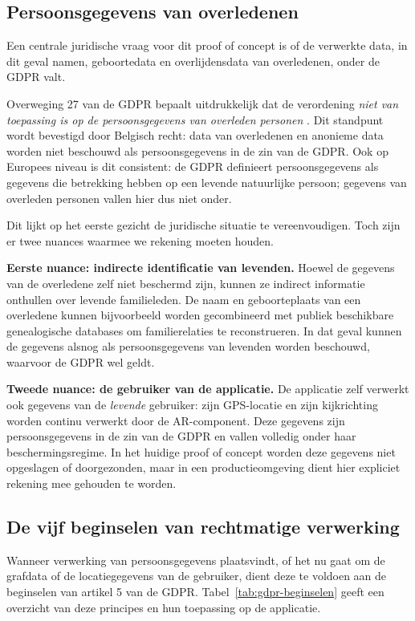 \subsection{Persoonsgegevens van overledenen}

Een centrale juridische vraag voor dit proof of concept is of de verwerkte data, in dit geval namen, geboortedata en overlijdensdata van overledenen, onder de GDPR valt.

Overweging 27 van de GDPR bepaalt uitdrukkelijk dat de verordening \textit{niet van toepassing is op de persoonsgegevens van overleden personen} \autocite{GDPROverweging27}. Dit standpunt wordt bevestigd door Belgisch recht: data van overledenen en anonieme data worden niet beschouwd als persoonsgegevens in de zin van de GDPR. Ook op Europees niveau is dit consistent: de GDPR definieert persoonsgegevens als gegevens die betrekking hebben op een levende natuurlijke persoon; gegevens van overleden personen vallen hier dus niet onder.

Dit lijkt op het eerste gezicht de juridische situatie te vereenvoudigen. Toch zijn er twee nuances waarmee we rekening moeten houden.

\textbf{Eerste nuance: indirecte identificatie van levenden.} Hoewel de gegevens van de overledene zelf niet beschermd zijn, kunnen ze indirect informatie onthullen over levende familieleden. De naam en geboorteplaats van een overledene kunnen bijvoorbeeld worden gecombineerd met publiek beschikbare genealogische databases om familierelaties te reconstrueren. In dat geval kunnen de gegevens alsnog als persoonsgegevens van levenden worden beschouwd, waarvoor de GDPR wel geldt.

\textbf{Tweede nuance: de gebruiker van de applicatie.} De applicatie zelf verwerkt ook gegevens van de \textit{levende} gebruiker: zijn GPS-locatie en zijn kijkrichting worden continu verwerkt door de AR-component. Deze gegevens zijn persoonsgegevens in de zin van de GDPR en vallen volledig onder haar beschermingsregime. In het huidige proof of concept worden deze gegevens niet opgeslagen of doorgezonden, maar in een productieomgeving dient hier expliciet rekening mee gehouden te worden.

\subsection{De vijf beginselen van rechtmatige verwerking}

Wanneer verwerking van persoonsgegevens plaatsvindt, of het nu gaat om de grafdata of de locatiegegevens van de gebruiker, dient deze te voldoen aan de beginselen van artikel 5 van de GDPR. Tabel~\ref{tab:gdpr-beginselen} geeft een overzicht van deze principes en hun toepassing op de applicatie.


